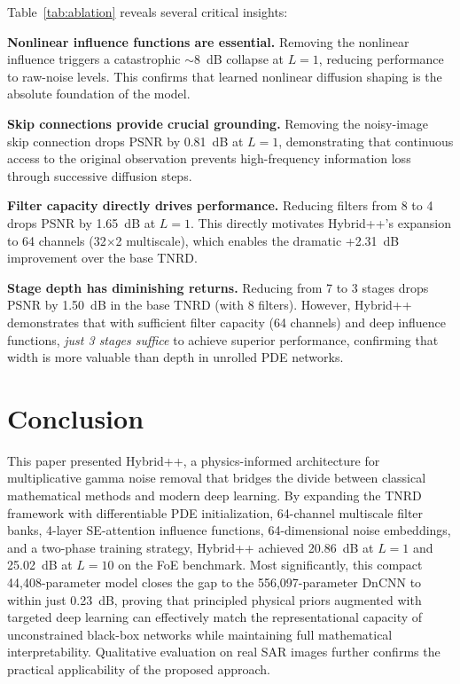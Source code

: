 \documentclass[conference]{IEEEtran}
\begin{document}
Table~\ref{tab:ablation} reveals several critical insights:

\textbf{Nonlinear influence functions are essential.} Removing the nonlinear influence triggers a catastrophic ${\sim}8$~dB collapse at $L{=}1$, reducing performance to raw-noise levels. This confirms that learned nonlinear diffusion shaping is the absolute foundation of the model.

\textbf{Skip connections provide crucial grounding.} Removing the noisy-image skip connection drops PSNR by 0.81~dB at $L{=}1$, demonstrating that continuous access to the original observation prevents high-frequency information loss through successive diffusion steps.

\textbf{Filter capacity directly drives performance.} Reducing filters from 8 to 4 drops PSNR by 1.65~dB at $L{=}1$. This directly motivates Hybrid++'s expansion to 64 channels (32$\times$2 multiscale), which enables the dramatic +2.31~dB improvement over the base TNRD.

\textbf{Stage depth has diminishing returns.} Reducing from 7 to 3 stages drops PSNR by 1.50~dB in the base TNRD (with 8 filters). However, Hybrid++ demonstrates that with sufficient filter capacity (64 channels) and deep influence functions, \textit{just 3 stages suffice} to achieve superior performance, confirming that width is more valuable than depth in unrolled PDE networks.

\section{Conclusion}
This paper presented Hybrid++, a physics-informed architecture for multiplicative gamma noise removal that bridges the divide between classical mathematical methods and modern deep learning. By expanding the TNRD framework with differentiable PDE initialization, 64-channel multiscale filter banks, 4-layer SE-attention influence functions, 64-dimensional noise embeddings, and a two-phase training strategy, Hybrid++ achieved 20.86~dB at $L{=}1$ and 25.02~dB at $L{=}10$ on the FoE benchmark. Most significantly, this compact 44,408-parameter model closes the gap to the 556,097-parameter DnCNN to within just 0.23~dB, proving that principled physical priors augmented with targeted deep learning can effectively match the representational capacity of unconstrained black-box networks while maintaining full mathematical interpretability. Qualitative evaluation on real SAR images further confirms the practical applicability of the proposed approach.
\end{document}
